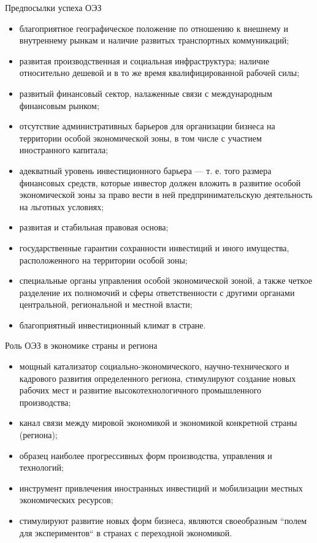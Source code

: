 \documentclass[_Venture_p3.tex]{subfiles}
\begin{document}
\begin{frame}[allowframebreaks]{Предпосылки успеха ОЭЗ}{}
\begin{itemize}
	\item благоприятное географическое положение по отношению к внешнему и внутреннему рынкам и наличие развитых транспортных коммуникаций;
	\item развитая производственная и социальная инфраструктура;
	наличие относительно дешевой и в то же время квалифицированной рабочей силы;
	
	\pagebreak
	\item развитый финансовый сектор, налаженные связи с международным финансовым рынком;
	\item отсутствие административных барьеров для организации бизнеса на территории особой экономической зоны, в том числе с участием иностранного капитала;

	\pagebreak
	\item адекватный уровень инвестиционного барьера — т. е. того размера финансовых средств, которые инвестор должен вложить в развитие особой экономической зоны за право вести в ней предпринимательскую деятельность на льготных условиях;

	\pagebreak
	\item развитая и стабильная правовая основа;
	\item государственные гарантии сохранности инвестиций и иного имущества, расположенного на территории особой зоны;

	\pagebreak
	\item специальные органы управления особой экономической зоной, а также четкое разделение их полномочий и сферы ответственности с другими органами центральной, региональной и местной власти;
	\item благоприятный инвестиционный климат в стране.
\end{itemize}
\end{frame}



\begin{frame}[allowframebreaks]{Роль ОЭЗ в экономике страны и региона}{}
\begin{itemize}
	\item мощный катализатор социально-экономического, научно-технического и кадрового развития определенного региона, стимулируют создание новых рабочих мест и развитие высокотехнологичного промышленного производства;
	\item канал связи между мировой экономикой и экономикой конкретной страны (региона);
	
	\pagebreak
	\item образец наиболее прогрессивных форм производства, управления и технологий;
	\item инструмент привлечения иностранных инвестиций и мобилизации местных экономических ресурсов;

	\pagebreak
	\item стимулируют развитие новых форм бизнеса, являются своеобразным ``полем для экспериментов`` в странах с переходной экономикой.
\end{itemize}
\end{frame}
\end{document}
